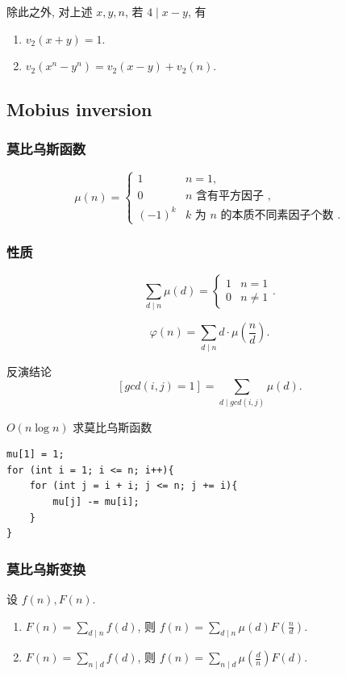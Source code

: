 \documentclass[UTF8, a4paper, titlepage, twoside]{ctexart}
\begin{document}
除此之外, 对上述 \(x, y, n\), 若 \(4 \mid x - y\), 有
\begin{enumerate}
    \item \(v_2(x + y) = 1.\)
    \item \(v_2(x^n - y^n) = v_2(x - y) + v_2(n).\)
\end{enumerate}

\subsection{ Mobius inversion}

\subsubsection*{ 莫比乌斯函数 }

\[
    \mu(n) =
    \begin{cases}
        1      & n = 1,                                \\
        0      & n \text{ 含有平方因子\ },                   \\
        (-1)^k & k \text{ 为\ } n \text{ 的本质不同素因子个数\ }.
    \end{cases}
\]

\subsubsection*{ 性质 }

\[
    \sum_{d \mid n} \mu(d) = \begin{cases} 1 & n = 1 \\ 0 & n \neq 1 \end{cases}.
\]

\[
    \varphi(n) = \sum_{d \mid n} d \cdot \mu(\frac{n}{d}).
\]

反演结论
\[
    [gcd(i, j) = 1] = \sum_{d \mid gcd(i, j)} \mu(d).
\]

\(O(n \log n)\) 求莫比乌斯函数

\begin{lstlisting}[style=cpp]
mu[1] = 1;
for (int i = 1; i <= n; i++){
    for (int j = i + i; j <= n; j += i){
        mu[j] -= mu[i];
    }
}
\end{lstlisting}

\subsubsection*{ 莫比乌斯变换 }

设 \(f(n), F(n)\).
\begin{enumerate}
    \item \(F(n) = \sum_{d \mid n} f(d)\), 则 \(f(n) = \sum_{d \mid n} \mu(d) F\left(\frac{n}{d}\right)\).
    \item \(F(n) = \sum_{n \mid d} f(d)\), 则 \(f(n) = \sum_{n \mid d} \mu\left(\frac{d}{n}\right) F(d)\).
\end{enumerate}
\end{document}
